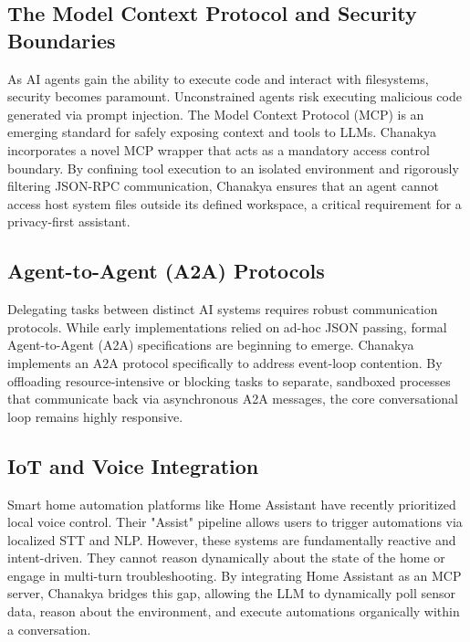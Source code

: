 \documentclass[conference]{IEEEtran}
\begin{document}
\subsection{The Model Context Protocol and Security Boundaries}
As AI agents gain the ability to execute code and interact with filesystems, security becomes paramount. Unconstrained agents risk executing malicious code generated via prompt injection. The Model Context Protocol (MCP) \cite{mcp2024} is an emerging standard for safely exposing context and tools to LLMs. Chanakya incorporates a novel MCP wrapper that acts as a mandatory access control boundary. By confining tool execution to an isolated environment and rigorously filtering JSON-RPC communication, Chanakya ensures that an agent cannot access host system files outside its defined workspace, a critical requirement for a privacy-first assistant.

\subsection{Agent-to-Agent (A2A) Protocols}
Delegating tasks between distinct AI systems requires robust communication protocols. While early implementations relied on ad-hoc JSON passing, formal Agent-to-Agent (A2A) specifications are beginning to emerge. Chanakya implements an A2A protocol specifically to address event-loop contention. By offloading resource-intensive or blocking tasks to separate, sandboxed processes that communicate back via asynchronous A2A messages, the core conversational loop remains highly responsive.

\subsection{IoT and Voice Integration}
Smart home automation platforms like Home Assistant \cite{homeassistant} have recently prioritized local voice control. Their "Assist" pipeline allows users to trigger automations via localized STT and NLP. However, these systems are fundamentally reactive and intent-driven. They cannot reason dynamically about the state of the home or engage in multi-turn troubleshooting. By integrating Home Assistant as an MCP server, Chanakya bridges this gap, allowing the LLM to dynamically poll sensor data, reason about the environment, and execute automations organically within a conversation.
\end{document}
